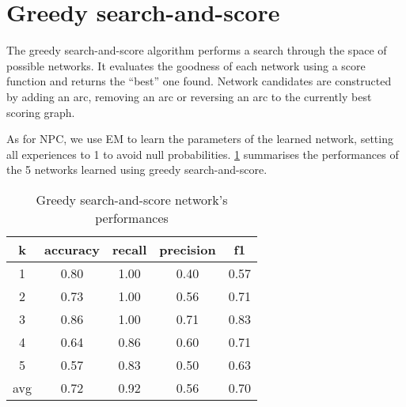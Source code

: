 \section{Greedy search-and-score}
\label{sec:greedy}

The greedy search-and-score algorithm performs a search through the space of possible networks.
It evaluates the goodness of each network using a score function and returns the ``best'' one found.
Network candidates are constructed by adding an arc, removing an arc or reversing an arc to the currently best scoring graph.

As for NPC, we use \ac{EM} to learn the parameters of the learned network, setting all experiences to \num{1} to avoid null probabilities. \cref{tab:greedy} summarises the performances of the \num{5} networks learned using greedy search-and-score.

\begin{table}
	\centering
	\caption{Greedy search-and-score network's performances}
	\label{tab:greedy}
	\begin{tabular}{ccccc}
    	\toprule
    	    \multicolumn{1}{c}{k} &
    		\multicolumn{1}{c}{accuracy} &
    		\multicolumn{1}{c}{recall} &
    		\multicolumn{1}{c}{precision} &
    		\multicolumn{1}{c}{f1} \\
    	\midrule
    		1   & 0.80 & 1.00 & 0.40 & 0.57 \\
    		2   & 0.73 & 1.00 & 0.56 & 0.71 \\
    		3   & 0.86 & 1.00 & 0.71 & 0.83 \\
    		4   & 0.64 & 0.86 & 0.60 & 0.71 \\
    		5   & 0.57 & 0.83 & 0.50 & 0.63 \\[2pt]
    		\hline
    		avg & 0.72 & 0.92 & 0.56 & 0.70 \Tstrut\Bstrut\\
    	\bottomrule    
	\end{tabular}
\end{table}

